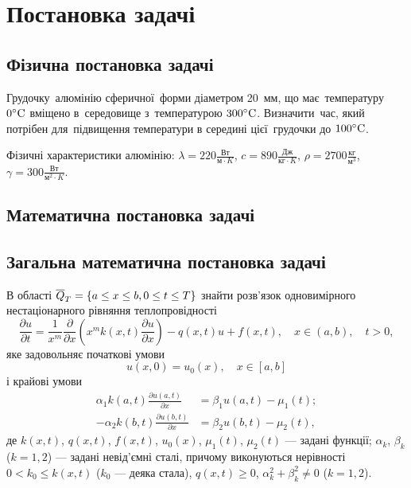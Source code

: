 

\newcommand{\range}[2]{\ol{#1..#2}}




\tableofcontents

\section{Постановка задачі}

\subsection{Фізична постановка задачі}

Грудочку~алюмінію сферичної~форми діаметром 20~мм, що має~температуру $0 ^\circ \text{C}$ вміщено в~середовище з~температурою $300 ^\circ \text{C}$. Визначити~час, який потрібен для~підвищення температури в середині цієї~грудочки до $100 ^\circ \text{C}$. \medskip

Фізичні характеристики алюмінію: $\lambda = 220 \frac{\text{Вт}}{\text{м} \cdot K}$, $c = 890 \frac{\text{Дж}}{\text{кг} \cdot K}$, $\rho = 2700 \frac{\text{кг}}{\text{м}^3}$, $\gamma = 300 \frac{\text{Вт}}{\text{м}^2 \cdot K}$.

\subsection{Математична постановка задачі}

\subsection{Загальна математична постановка задачі}

В області $\overline{Q}_T = \{a \le x \le b, 0 \le t \le T\}$ знайти розв'язок одновимірного нестаціонарного рівняння теплопровідності
\begin{equation}
    \frac{\partial u}{\partial t} = \frac{1}{x^m} \frac{\partial}{\partial x} \left( x^m k(x, t) \frac{\partial u}{\partial x} \right) - q(x, t) u + f(x, t), \quad x \in (a, b), \quad t > 0,
\end{equation}
яке задовольняє початкові умови
\begin{equation}
    u(x, 0) = u_0(x), \quad x \in [a, b]
\end{equation}
і крайові умови
\begin{equation}
    \begin{aligned}
        \alpha_1 k(a, t) \frac{\partial u(a, t)}{\partial x} &= \beta_1 u(a, t) - \mu_1(t); \\
        -\alpha_2 k(b, t) \frac{\partial u(b, t)}{\partial x} &= \beta_2 u(b, t) - \mu_2(t),
    \end{aligned}
\end{equation}
де $k(x, t)$, $q(x, t)$, $f(x, t)$, $u_0(x)$, $\mu_1(t)$, $\mu_2(t)$ --- задані функції; $\alpha_k$, $\beta_k$ ($k=1,2$) --- задані невід'ємні сталі, причому виконуються нерівності $0 < k_0 \le k(x, t)$ ($k_0$ --- деяка стала), $q(x, t) \ge 0$, $\alpha_k^2 + \beta_k^2 \ne 0$ ($k=1,2$).

